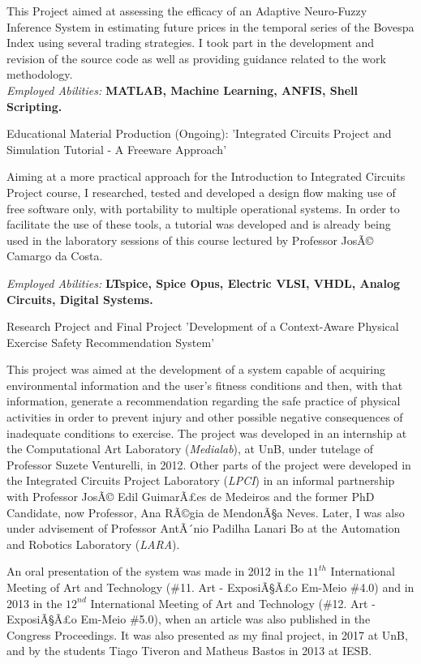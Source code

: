 \documentclass[a4paper]{twentysecondcv} %
\begin{document}
\begin{twenty}
{This Project aimed at assessing the efficacy of an Adaptive Neuro-Fuzzy Inference System in estimating future prices in the temporal series of the Bovespa Index using several trading strategies. I took part in the development and revision of the source code as well as providing guidance related to the work methodology.\\
\textit{Employed Abilities:} \textbf{MATLAB, Machine Learning, ANFIS, Shell Scripting.\\}}

\twentyitem
{Educational Material Production (Ongoing):}
{'Integrated Circuits Project and Simulation Tutorial - A Freeware Approach'}
{}
{\hspace{8pt} Aiming at a more practical approach for the Introduction to Integrated Circuits Project course, I researched, tested and developed a design flow making use of free software only, with portability to multiple operational systems. In order to facilitate the use of these tools, a tutorial was developed and is already being used in the laboratory sessions of this course lectured by Professor JosÃ© Camargo da Costa.

\hspace{8pt}\textit{Employed Abilities:} \textbf{LTspice, Spice Opus, Electric VLSI, VHDL, Analog Circuits, Digital Systems.\\}}

\twentyitem
{Research Project and Final Project}
{'Development of a Context-Aware Physical Exercise Safety Recommendation System'}
{}
{\hspace{8pt}This project was aimed at the development of a system capable of acquiring environmental information and the user's fitness conditions and then, with that information, generate a recommendation regarding the safe practice of physical activities in order to prevent injury and other possible negative consequences of inadequate conditions to exercise. The project was developed in an internship at the Computational Art Laboratory (\textit{Medialab}), at UnB, under tutelage of Professor Suzete Venturelli, in 2012. Other parts of the project were developed in the Integrated Circuits Project Laboratory (\textit{LPCI}) in an informal partnership with Professor JosÃ© Edil GuimarÃ£es de Medeiros and the former PhD Candidate, now Professor, Ana RÃ©gia de MendonÃ§a Neves. Later, I was also under advisement of Professor AntÃ´nio Padilha Lanari Bo at the Automation and Robotics Laboratory (\textit{LARA}).

\hspace{8pt}An oral presentation of the system was made in 2012 in the $11^{th}$ International Meeting of Art and Technology (\#11. Art - ExposiÃ§Ã£o Em-Meio \#4.0) and in 2013 in the $12^{nd}$ International Meeting of Art and Technology (\#12. Art - ExposiÃ§Ã£o Em-Meio \#5.0), when an article was also published in the Congress Proceedings. It was also presented as my final project, in 2017 at UnB, and by the students Tiago Tiveron and Matheus Bastos in 2013 at IESB.

}
\end{twenty}
\end{document}
